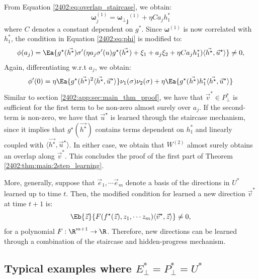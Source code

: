 From Equation \eqref{2402:eq:overlap_staircase}, we obtain:
\begin{equation}
    \boldsymbol{\omega}_j^{(1)} = \boldsymbol{{\omega_{\perp}}_j}^{(1)}+\eta C a_j h^*_1 
\end{equation}
where $C$ denotes a constant dependent on $g^*$. Since $\boldsymbol{\omega}^{(1)}$ is now correlated with $h^*_1$, the condition in Equation \eqref{2402:eq:phi} is modified to:
\begin{equation}
   \phi(a_j)= \Ea{g^\star(\vec{h^\star})\sigma'(\eta a_j\sigma'(u)g^\star(\vec{h^\star})+\xi_1+a_j\xi_2+\eta C a_j h^*_1)\langle\vec{h^\star},\vec{u}^\star\rangle} \neq 0,
\end{equation}
Again, differentiating w.r.t $a_j$, we obtain:
\begin{equation}
    \phi'(0) = \eta \Ea{ g^\star(\vec{h^\star})^2\langle\vec{h^\star},\vec{u}^\star\rangle}\nu_1(\sigma)\nu_{2}(\sigma) + \eta \Ea{ g^\star(\vec{h^\star})h^*_1 \langle\vec{h^\star},\vec{u}^\star\rangle}
\end{equation}
Similar to section \ref{2402:app:sec:main_thm_proof}, we have that $\vec{v}^* \in P^*_\perp$ is sufficient for the first term to be non-zero almost surely over $a_j$. If the second-term is non-zero, we have that $\vec{u}^\star$ is learned through the staircase mechanism, since it implies that $g^\star(\vec{h^\star})$ contains terms dependent on $h^*_1$  and linearly coupled with $\langle\vec{h^\star},\vec{u}^\star\rangle$. In either case, we obtain that $W^{(2)}$ almost surely obtains an overlap along $\vec{v}^*$. This concludes the proof of the first part of Theorem \ref{2402:thm:main:2step_learning}.


More, generally, suppose that $\vec{e}_1,\cdots \vec{e}_m$ denote a basis of the directions in $U^*$ learned up to time $t$. Then, the modified condition for learned a new direction $\vec{v}^*$ at time $t+1$ is:
\begin{equation}\label{2402:eq:f_hard}
        \Eb{\vec{z}}{F(f^\star(\vec{z}),z_1,\cdots z_m)\langle \vec{v}^\star, \vec{z}\rangle}\neq 0,
\end{equation}
for a polynomial $F:\R^{m+1} \rightarrow \R$. Therefore, new directions can be learned through a combination of the staircase and hidden-progress mechanism. 


\subsection[Typical examples where 1]{Typical examples where $E_\perp^*=P^*_\perp = U^*$}
\label{2402:sec:app:even_sym}

